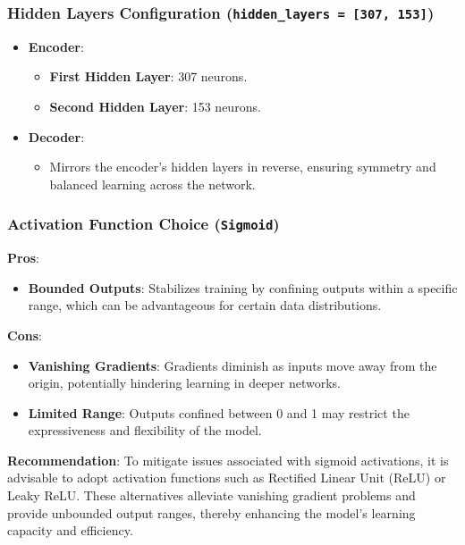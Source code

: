 \documentclass[10pt]{article}
\begin{document}
\subsubsection{Hidden Layers Configuration (\texttt{hidden\_layers = [307, 153]})}

\begin{itemize}
    \item \textbf{Encoder}:
    \begin{itemize}
        \item \textbf{First Hidden Layer}: 307 neurons.
        \item \textbf{Second Hidden Layer}: 153 neurons.
    \end{itemize}
    \item \textbf{Decoder}:
    \begin{itemize}
        \item Mirrors the encoder's hidden layers in reverse, ensuring symmetry and balanced learning across the network.
    \end{itemize}
\end{itemize}

\subsubsection{Activation Function Choice (\texttt{Sigmoid})}

\textbf{Pros}:

\begin{itemize}
    \item \textbf{Bounded Outputs}: Stabilizes training by confining outputs within a specific range, which can be advantageous for certain data distributions.
\end{itemize}

\textbf{Cons}:

\begin{itemize}
    \item \textbf{Vanishing Gradients}: Gradients diminish as inputs move away from the origin, potentially hindering learning in deeper networks.
    \item \textbf{Limited Range}: Outputs confined between 0 and 1 may restrict the expressiveness and flexibility of the model.
\end{itemize}

\textbf{Recommendation}: To mitigate issues associated with sigmoid activations, it is advisable to adopt activation functions such as Rectified Linear Unit (ReLU) or Leaky ReLU. These alternatives alleviate vanishing gradient problems and provide unbounded output ranges, thereby enhancing the model's learning capacity and efficiency.
\end{document}
